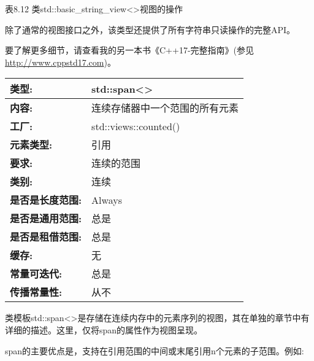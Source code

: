 \begin{center}
表8.12 类std::basic\_string\_view<>视图的操作
\end{center}

除了通常的视图接口之外，该类型还提供了所有字符串只读操作的完整API。

要了解更多细节，请查看我的另一本书《C++17-完整指南》(参见\url{http://www.cppstd17.com})。


\begin{longtable}[c]{|l|l|}
\hline
\textbf{类型:}                 & std::span\textless{}\textgreater{}           \\ \hline
\endfirsthead
%
\endhead
%
\textbf{内容:}              & 连续存储器中一个范围的所有元素 \\ \hline
\textbf{工厂:}              & std::views::counted()                        \\ \hline
\textbf{元素类型:}         & 引用                                    \\ \hline
\textbf{要求:}             & 连续的范围                             \\ \hline
\textbf{类别:}             & 连续                                   \\ \hline
\textbf{是否是长度范围:}       & Always                                       \\ \hline
\textbf{是否是通用范围:}      & 总是                                       \\ \hline
\textbf{是否是租借范围:}    & 总是                                       \\ \hline
\textbf{缓存:}               & 无                                      \\ \hline
\textbf{常量可迭代:}       & 总是                                       \\ \hline
\textbf{传播常量性:} & 从不                                        \\ \hline
\end{longtable}

类模板std::span<>是存储在连续内存中的元素序列的视图，其在单独的章节中有详细的描述。这里，仅将span的属性作为视图呈现。

span的主要优点是，支持在引用范围的中间或末尾引用n个元素的子范围。例如:

